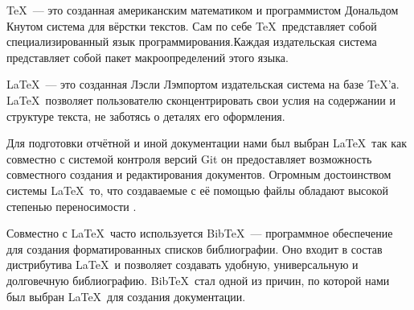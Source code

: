 \TeX\ --- это созданная американским математиком и программистом Дональдом Кнутом система для вёрстки текстов. Сам по себе \TeX\ представляет собой специализированный язык программирования.Каждая издательская система представляет собой пакет макроопределений этого языка.

\LaTeX\ --- это созданная Лэсли Лэмпортом издательская система на базе \TeX'а\cite{lvovskyi}. \LaTeX\ позволяет пользователю сконцентрировать свои услия на содержании и структуре текста, не заботясь о деталях его оформления.

Для подготовки отчётной и иной документации нами был выбран \LaTeX\, так как совместно с системой контроля версий Git он предоставляет возможность совместного создания и редактирования документов. Огромным достоинством системы \LaTeX\ то, что создаваемые с её помощью файлы обладают высокой степенью переносимости \cite{latexrus}.

Совместно с \LaTeX\ часто используется Bib\TeX\ --- программное обеспечение для создания форматированных списков библиографии. Оно входит в состав дистрибутива \LaTeX\ и позволяет создавать удобную, универсальную и долговечную библиографию. Bib\TeX\ стал одной из причин, по которой нами был выбран \LaTeX\ для создания документации.
